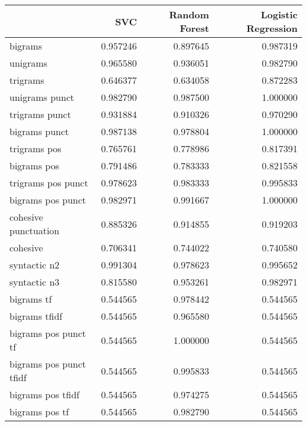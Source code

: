 \begin{tabular}{lrrr}
\toprule
{} &       SVC &  Random Forest &  Logistic Regression \\
\midrule
bigrams                    &  0.957246 &       0.897645 &             0.987319 \\
unigrams                   &  0.965580 &       0.936051 &             0.982790 \\
trigrams                   &  0.646377 &       0.634058 &             0.872283 \\
unigrams punct             &  0.982790 &       0.987500 &             1.000000 \\
trigrams punct             &  0.931884 &       0.910326 &             0.970290 \\
bigrams punct              &  0.987138 &       0.978804 &             1.000000 \\
trigrams pos               &  0.765761 &       0.778986 &             0.817391 \\
bigrams pos                &  0.791486 &       0.783333 &             0.821558 \\
trigrams pos punct         &  0.978623 &       0.983333 &             0.995833 \\
bigrams pos punct          &  0.982971 &       0.991667 &             1.000000 \\
cohesive punctuation       &  0.885326 &       0.914855 &             0.919203 \\
cohesive                   &  0.706341 &       0.744022 &             0.740580 \\
syntactic n2               &  0.991304 &       0.978623 &             0.995652 \\
syntactic n3               &  0.815580 &       0.953261 &             0.982971 \\
bigrams tf                 &  0.544565 &       0.978442 &             0.544565 \\
bigrams tfidf              &  0.544565 &       0.965580 &             0.544565 \\
bigrams pos punct tf       &  0.544565 &       1.000000 &             0.544565 \\
bigrams pos punct tfidf    &  0.544565 &       0.995833 &             0.544565 \\
bigrams pos tfidf          &  0.544565 &       0.974275 &             0.544565 \\
bigrams pos tf             &  0.544565 &       0.982790 &             0.544565 \\

\end{tabular}
